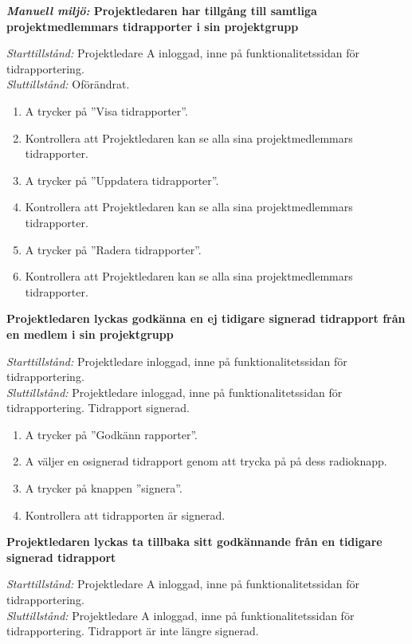 \documentclass[a4paper]{article}
\begin{document}
\begin{FT}

\item
\textbf{\emph{Manuell miljö:} Projektledaren har tillgång till samtliga projektmedlemmars tidrapporter i sin projektgrupp}

\emph{Starttillstånd:} Projektledare A inloggad, inne på funktionalitetssidan för tidrapportering.\\
\emph{Sluttillstånd:} Oförändrat.

\begin{enumerate}
\item A trycker på ''Visa tidrapporter''.
\item Kontrollera att Projektledaren kan se alla sina projektmedlemmars tidrapporter.
\item A trycker på ''Uppdatera tidrapporter''.
\item Kontrollera att Projektledaren kan se alla sina projektmedlemmars tidrapporter.
\item A trycker på ''Radera tidrapporter''.
\item Kontrollera att Projektledaren kan se alla sina projektmedlemmars tidrapporter.
\end{enumerate}

\item
\textbf{Projektledaren lyckas godkänna en ej tidigare signerad tidrapport från en medlem i sin projektgrupp}

\emph{Starttillstånd:} Projektledare inloggad, inne på funktionalitetssidan för tidrapportering.\\
\emph{Sluttillstånd:} Projektledare inloggad, inne på funktionalitetssidan för tidrapportering. Tidrapport signerad.

\begin{enumerate}
\item A trycker på ''Godkänn rapporter''.
\item A väljer en osignerad tidrapport genom att trycka på på dess radioknapp.
\item A trycker på knappen ''signera''.
\item Kontrollera att tidrapporten är signerad.
\end{enumerate}

\item
\textbf{Projektledaren lyckas ta tillbaka sitt godkännande från en tidigare signerad tidrapport}

\emph{Starttillstånd:} Projektledare A inloggad, inne på funktionalitetssidan för tidrapportering.\\
\emph{Sluttillstånd:} Projektledare A inloggad, inne på funktionalitetssidan för tidrapportering. Tidrapport är inte längre signerad.


\end{FT}
\end{document}
